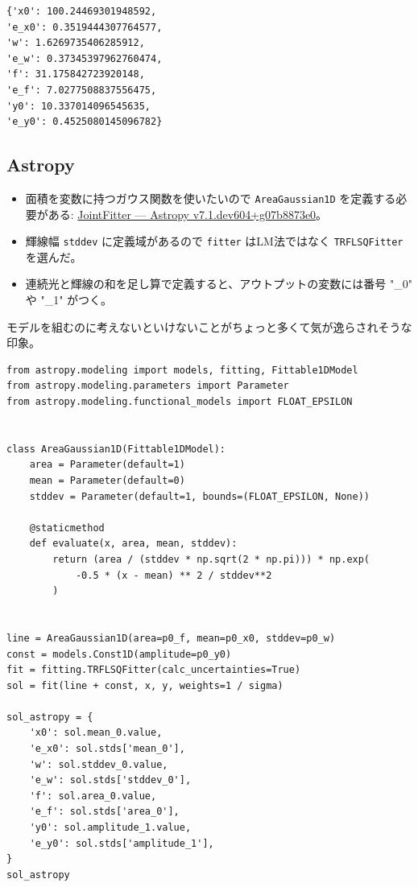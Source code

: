 \documentclass[a4paper, 9pt, notitlepage, uplatex, dvipdfmx]{jsarticle}
\begin{document}
\label{}
\begin{verbatim}
{'x0': 100.24469301948592,
'e_x0': 0.3519444307764577,
'w': 1.6269735406285912,
'e_w': 0.37345397962760474,
'f': 31.175842723920148,
'e_f': 7.0277508837556475,
'y0': 10.337014096545635,
'e_y0': 0.4525080145096782}
\end{verbatim}
\subsection{Astropy}
\label{sec:orgcd8dda1}
\begin{itemize}
\item 面積を変数に持つガウス関数を使いたいので \texttt{AreaGaussian1D} を定義する必要がある: \href{https://docs.astropy.org/en/latest/modeling/jointfitter.html\#example-spectral-line}{JointFitter — Astropy v7.1.dev604+g07b8873e0}。
\item 輝線幅 \texttt{stddev} に定義域があるので \texttt{fitter} はLM法ではなく \texttt{TRFLSQFitter} を選んだ。
\item 連続光と輝線の和を足し算で定義すると、アウトプットの変数には番号 "\_0" や "\_1" がつく。
\end{itemize}
モデルを組むのに考えないといけないことがちょっと多くて気が逸らされそうな印象。

\begin{verbatim}
from astropy.modeling import models, fitting, Fittable1DModel
from astropy.modeling.parameters import Parameter
from astropy.modeling.functional_models import FLOAT_EPSILON


class AreaGaussian1D(Fittable1DModel):
    area = Parameter(default=1)
    mean = Parameter(default=0)
    stddev = Parameter(default=1, bounds=(FLOAT_EPSILON, None))

    @staticmethod
    def evaluate(x, area, mean, stddev):
        return (area / (stddev * np.sqrt(2 * np.pi))) * np.exp(
            -0.5 * (x - mean) ** 2 / stddev**2
        )


line = AreaGaussian1D(area=p0_f, mean=p0_x0, stddev=p0_w)
const = models.Const1D(amplitude=p0_y0)
fit = fitting.TRFLSQFitter(calc_uncertainties=True)
sol = fit(line + const, x, y, weights=1 / sigma)

sol_astropy = {
    'x0': sol.mean_0.value,
    'e_x0': sol.stds['mean_0'],
    'w': sol.stddev_0.value,
    'e_w': sol.stds['stddev_0'],
    'f': sol.area_0.value,
    'e_f': sol.stds['area_0'],
    'y0': sol.amplitude_1.value,
    'e_y0': sol.stds['amplitude_1'],
}
sol_astropy
\end{verbatim}
\end{document}
